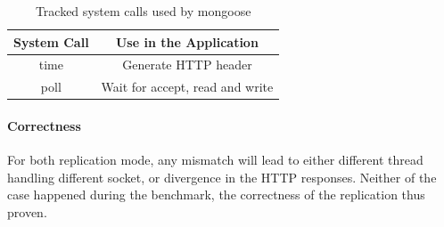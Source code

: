 \begin{table}
\caption{Tracked system calls used by mongoose}
\begin{center}
 \begin{tabular}{c | c}
System Call & Use in the Application\\ \hline
 time & Generate HTTP header  \\ \hline
 poll & Wait for accept, read and write
 \end{tabular}
\end{center}
\label{t:mongoose_syscall}
\end{table}

\paragraph{Correctness} For both replication mode, any mismatch will lead to either different thread handling different socket, or divergence in the HTTP responses. Neither of the case happened during the benchmark, the correctness of the replication thus proven.

